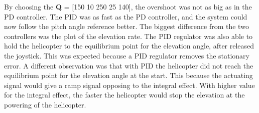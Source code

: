 By choosing the \textbf{Q} = [150 10 250 25 140], the overshoot was not as big as in the PD controller. The PID was as fast as the PD controller, and the system could now follow the pitch angle reference better. The biggest difference from the two controllers was the plot of the elevation rate. The PID regulator was also able to hold the helicopter to the equilibrium point for the elevation angle, after released the joystick. This was expected because a PID regulator removes the stationary error. A different observation was that with PID the helicopter did not reach the equilibrium point for the elevation angle at the start. This because the actuating signal would give a ramp signal opposing to the integral effect. With higher value for the integral effect, the faster the helicopter would stop the elevation at the powering of the helicopter.  